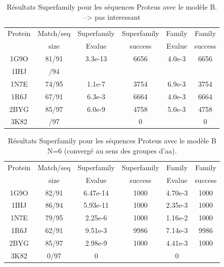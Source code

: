    \clearpage   


   
\begin{table}[h]
  \raggedleft{}
  
  \begin{tabular}{cccccc}
    
    \toprule
    Protein & Match/seq & Superfamily & Superfamily & Family & Family \\
            & size      & Evalue      & success     & Evalue & success\\
    \cmidrule{1-6}
    1G9O  & 81/91 & 3.3e-13  & 6656  &  4.0e-3 & 6656 \\
    1IHJ  &  /94 &      &    &   &    \\
    1N7E  & 74/95 & 1.1e-7  & 3754  &  6.9e-3 & 3754 \\
    1R6J  & 67/91 & 6.3e-3  & 6664  &  4.0e-3 & 6664 \\
    2BYG  & 85/97 & 6.0e-9  & 4758  & 5.0e-3  & 4758 \\
    3K82  & /97 &           &   0    &        &  0   \\

    \bottomrule        
  \end{tabular}   
  \caption{Résultats Superfamily pour les séquences Proteus avec le modèle B. --> pas interessant}   
  \label{tab:superfamily}       
\end{table}


   \clearpage   


   
\begin{table}[h]
  \raggedleft{}
  
  \begin{tabular}{cccccc}
    
    \toprule
    Protein & Match/seq & Superfamily & Superfamily & Family & Family \\
            & size      & Evalue      & success     & Evalue & success\\
    \cmidrule{1-6}
    1G9O  & 82/91 & 6.47e-14 & 1000  & 4.70e-3  & 1000 \\
    1IHJ  & 86/94 & 5.93e-11 & 1000  & 2.35e-3  & 1000 \\
    1N7E  & 79/95 & 2.25e-6  & 1000  & 1.16e-2  & 1000 \\
    1R6J  & 62/91 & 9.51e-3  & 9986  & 7.14e-3  & 9986 \\
    2BYG  & 85/97 & 2.98e-9  & 1000  & 4.41e-3  & 1000 \\
    3K82  & 0/97 & 0         &   & 0  &  \\

    \bottomrule        
  \end{tabular}   
  \caption{Résultats Superfamily pour les séquences Proteus avec le modèle B N=6 (convergé au sens des groupes d'aa).}   
  \label{tab:superfamily_model_B6}       
\end{table}


